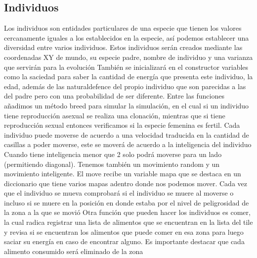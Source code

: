 \documentclass{llncs}
\begin{document}
\subsection{Individuos}
Los individuos son entidades particulares de una especie que tienen los valores cercanamente iguales a los establecidos en la especie, así podemos establecer una diversidad entre varios individuos.
\newline
\newline
Estos individuos serán creados mediante las coordenadas XY de mundo, su especie padre, nombre de individuo y una varianza que servirán para la evolución
\newline
\newline
También se inicializará en el constructor variables como la saciedad para saber la cantidad de energía que presenta este individuo, la edad, además de las naturaldefence del propio individuo que son parecidas a las del padre pero con una probabilidad de ser diferente.
\newline
\newline
Entre las funciones añadimos un método breed para simular la simulación, en el cual si un individuo tiene reproducción asexual se realiza una clonación, mientras que si tiene reproducción sexual entonces verificamos si la especie femenina es fertil.
\newline
\newline
Cada individuo puede moverse de acuerdo a una velocidad traducida en la cantidad de casillas a poder moverse, este se moverá de acuerdo a la inteligencia del individuo
\newline
\newline
Cuando tiene inteligencia menor que 2 solo podrá moverse para un lado (permitiendo diagonal).
\newline
\newline
Tenemos también un movimiento random y un movimiento inteligente.
\newline
\newline
El move recibe un variable mapa que se destaca en un diccionario que tiene varios mapas adentro donde nos podemos mover.
\newline
\newline
Cada vez que el individuo se mueva comprobará si el individuo se muere al moverse o incluso si se muere en la posición en donde estaba por el nivel de peligrosidad de la zona a la que se movió
\newline
\newline
Otra función que pueden hacer los individuos es comer, la cual radica registrar una lista de alimentos que se encuentran en la lista del tile y revisa si se encuentran los alimentos que puede comer en esa zona para luego saciar su energía en caso de encontrar alguno. Es importante destacar que cada alimento consumido será eliminado de la zona
\end{document}
